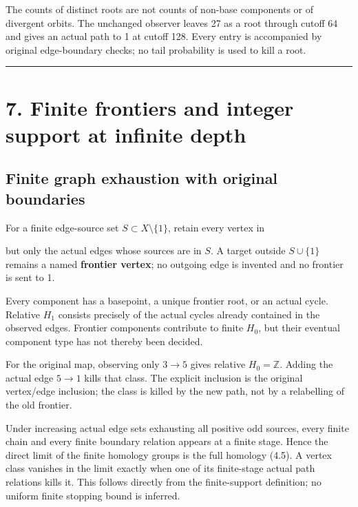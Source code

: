 The counts of distinct roots are not counts of non-base components or of
divergent orbits. The unchanged observer leaves 27 as a root through
cutoff 64 and gives an actual path to 1 at cutoff 128. Every entry is
accompanied by original edge-boundary checks; no tail probability is
used to kill a root.

\begin{center}\rule{0.5\linewidth}{0.5pt}\end{center}

\section{7. Finite frontiers and integer support at infinite depth}

\subsection{Finite graph exhaustion with original boundaries}

For a finite edge-source set \(S\subset X\setminus\{1\}\), retain every
vertex in


but only the actual edges whose sources are in \(S\). A target outside
\(S\cup\{1\}\) remains a named \textbf{frontier vertex}; no outgoing
edge is invented and no frontier is sent to 1.

Every component has a basepoint, a unique frontier root, or an actual
cycle. Relative \(H_1\) consists precisely of the actual cycles already
contained in the observed edges. Frontier components contribute to
finite \(H_0\), but their eventual component type has not thereby been
decided.

For the original map, observing only \(3\to5\) gives relative
\(H_0=\mathbb Z\). Adding the actual edge \(5\to1\) kills that class.
The explicit inclusion is the original vertex/edge inclusion; the class
is killed by the new path, not by a relabelling of the old frontier.

Under increasing actual edge sets exhausting all positive odd sources,
every finite chain and every finite boundary relation appears at a
finite stage. Hence the direct limit of the finite homology groups is
the full homology (4.5). A vertex class vanishes in the limit exactly
when one of its finite-stage actual path relations kills it. This
follows directly from the finite-support definition; no uniform finite
stopping bound is inferred.

